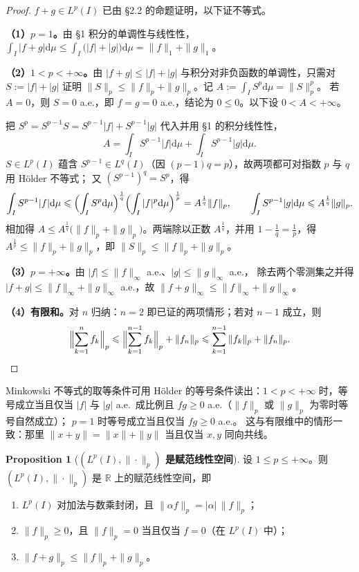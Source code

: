 \documentclass[oneside]{book}
\theoremstyle{definition}
\newcommand{\R}{\mathbb{R}}
\newcommand{\dd}{\mathrm{d}}
\theoremstyle{definition}
\newtheorem{proposition}{Proposition}[section]
\begin{document}
	\begin{proof}
		$f+g\in L^p(I)$ 已由 §2.2 的命题证明，以下证不等式。
		
		\textbf{（1）$p=1$。}由 §1 积分的单调性与线性性，
		$\int_I|f+g|\dd\mu\leqslant\int_I\bigl(|f|+|g|\bigr)\dd\mu=\|f\|_1+\|g\|_1$。
		
		\textbf{（2）$1<p<+\infty$。}由 $|f+g|\leqslant|f|+|g|$ 与积分对非负函数的单调性，只需对
		$S:=|f|+|g|$ 证明 $\|S\|_p\leqslant\|f\|_p+\|g\|_p$。记 $A:=\int_I S^p\dd\mu=\|S\|_p^p$。
		若 $A=0$，则 $S=0$ a.e.，即 $f=g=0$ a.e.，结论为 $0\leqslant0$。以下设 $0<A<+\infty$。
		
		把 $S^p=S^{p-1}S=S^{p-1}|f|+S^{p-1}|g|$ 代入并用 §1 的积分线性性，
		\[
		A=\int_I S^{p-1}|f|\dd\mu+\int_I S^{p-1}|g|\dd\mu .
		\]
		$S\in L^p(I)$ 蕴含 $S^{p-1}\in L^q(I)$（因 $(p-1)q=p$），故两项都可对指数 $p$ 与 $q$ 用 Hölder 不等式；
		又 $(S^{p-1})^q=S^p$，得
		\[
		\int_I S^{p-1}|f|\dd\mu
		\leqslant\Bigl(\int_I S^p\dd\mu\Bigr)^{\frac1q}\Bigl(\int_I|f|^p\dd\mu\Bigr)^{\frac1p}
		=A^{\frac1q}\|f\|_p,
		\qquad
		\int_I S^{p-1}|g|\dd\mu\leqslant A^{\frac1q}\|g\|_p .
		\]
		相加得 $A\leqslant A^{\frac1q}\bigl(\|f\|_p+\|g\|_p\bigr)$。两端除以正数 $A^{\frac1q}$，并用
		$1-\frac1q=\frac1p$，得 $A^{\frac1p}\leqslant\|f\|_p+\|g\|_p$，即 $\|S\|_p\leqslant\|f\|_p+\|g\|_p$。
		
		\textbf{（3）$p=+\infty$。}由 $|f|\leqslant\|f\|_\infty$ a.e.、$|g|\leqslant\|g\|_\infty$ a.e.，
		除去两个零测集之并得 $|f+g|\leqslant\|f\|_\infty+\|g\|_\infty$ a.e.，故
		$\|f+g\|_\infty\leqslant\|f\|_\infty+\|g\|_\infty$。
		
		\textbf{（4）有限和。}对 $n$ 归纳：$n=2$ 即已证的两项情形；若对 $n-1$ 成立，则
		\[
		\Bigl\|\sum_{k=1}^n f_k\Bigr\|_p\leqslant\Bigl\|\sum_{k=1}^{n-1}f_k\Bigr\|_p+\|f_n\|_p
		\leqslant\sum_{k=1}^{n-1}\|f_k\|_p+\|f_n\|_p .
		\]
	\end{proof}
	
	Minkowski 不等式的取等条件可用 Hölder 的等号条件读出：$1<p<+\infty$ 时，等号成立当且仅当
	$|f|$ 与 $|g|$ a.e.\ 成比例且 $fg\geqslant0$ a.e.（$\|f\|_p$ 或 $\|g\|_p$ 为零时等号自然成立）；
	$p=1$ 时等号成立当且仅当 $fg\geqslant0$ a.e.。
	这与有限维中的情形一致：那里 $\|x+y\|=\|x\|+\|y\|$ 当且仅当 $x,y$ 同向共线。
	
	\begin{proposition}[\bfseries{$(L^p(I),\|\cdot\|_p)$ 是赋范线性空间}]
		设 $1\leqslant p\leqslant+\infty$。则 $(L^p(I),\|\cdot\|_p)$ 是 $\R$ 上的赋范线性空间，即
		\begin{enumerate}[leftmargin=2.4em]
			\item $L^p(I)$ 对加法与数乘封闭，且 $\|\alpha f\|_p=|\alpha|\,\|f\|_p$；
			\item $\|f\|_p\geqslant0$，且 $\|f\|_p=0$ 当且仅当 $f=0$（在 $L^p(I)$ 中）；
			\item $\|f+g\|_p\leqslant\|f\|_p+\|g\|_p$。
		\end{enumerate}
	\end{proposition}
	
\end{document}
